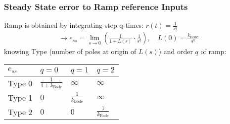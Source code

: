     \subsubsection{Steady State error to Ramp reference Inputs}
        Ramp is obtained by integrating step q-times: $r(t) = \frac{1}{s^q}$
        \begin{align*}
            \rightarrow e_{ss} = \lim\limits_{s \rightarrow 0} \left( \frac{1}{1 + L(s)} \cdot \frac{1}{s^q} \right), \quad
            L(0) = \frac{k_{\text{Bode}}}{s^q}
        \end{align*}
        knowing Type (number of poles at origin of $L(s)$) and order $q$ of ramp:\\
        \begin{tabu}[width = \linewidth]{| X | X | X | X |}
            \hline
            $e_{ss}$    & $q = 0$                           & $q = 1$                       & $q = 2$\\
            \hline \hline
            Type 0      & $\frac{1}{1 + k_{\text{Bode}}}$   & $\infty$                      & $\infty$\\
            \hline
            Type 1      & $0$                               & $\frac{1}{k_{\text{Bode}}}$   & $\infty$\\
            \hline
            Type 2      & $0$                               & $0$                           & $\frac{1}{k_{\text{Bode}}}$
        \end{tabu}